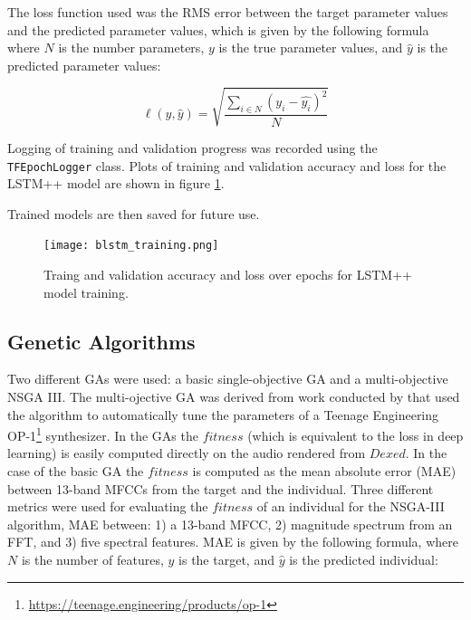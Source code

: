 The loss function used was the RMS error between the target parameter values and the predicted parameter values, which is given by the following formula where $N$ is the number parameters, $y$ is the true parameter values, and $\hat{y}$ is the predicted parameter values:

\begin{equation}
    \ell(y, \hat{y}) = \sqrt{\frac{\sum_{i \in N}{(y_i - \hat{y_i})^2}}{N}} 
\end{equation}

Logging of training and validation progress was recorded using the \texttt{TFEpochLogger} class. Plots of training and validation accuracy and loss for the LSTM++ model are shown in figure \ref{fig:lstm_bi_train}. 


Trained models are then saved for future use.

\begin{figure}[ht]
\begin{center}
\texttt{[image: blstm\_training.png]}
\caption{Traing and validation accuracy and loss over epochs for LSTM++ model training.}
\label{fig:lstm_bi_train}
\end{center}
\end{figure}

\subsection{Genetic Algorithms}
Two different GAs were used: a basic single-objective GA and a multi-objective NSGA III. The multi-ojective GA was derived from work conducted by \cite{macret2012automatic} that used the algorithm to automatically tune the parameters of a Teenage Engineering OP-1\footnote{\url{https://teenage.engineering/products/op-1}} synthesizer. In the GAs the $fitness$ (which is equivalent to the loss in deep learning) is easily computed directly on the audio rendered from $Dexed$. In the case of the basic GA the $fitness$ is computed as the mean absolute error (MAE) between 13-band MFCCs from the target and the individual. Three different metrics were used for evaluating the $fitness$ of an individual for the NSGA-III algorithm, MAE between: 1) a 13-band MFCC, 2) magnitude spectrum from an FFT, and 3) five spectral features. MAE is given by the following formula, where $N$ is the number of features, $y$ is the target, and $\hat{y}$ is the predicted individual:

